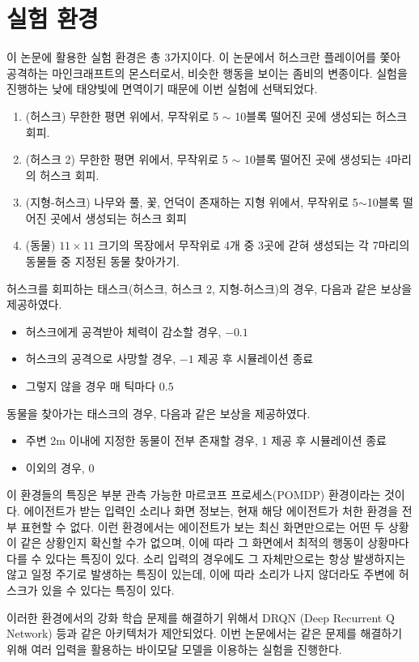 \documentclass[oneside, under, ko]{snuthesis}
\begin{document}
\section{실험 환경}
이 논문에 활용한 실험 환경은 총 3가지이다. 이 논문에서 허스크란 플레이어를 쫓아 공격하는 마인크래프트의 몬스터로서, 비슷한 행동을 보이는 좀비의 변종이다. 실험을 진행하는 낮에 태양빛에 면역이기 때문에 이번 실험에 선택되었다.
\begin{enumerate}
    \item (허스크) 무한한 평면 위에서, 무작위로 5 $\sim$ 10블록 떨어진 곳에 생성되는 허스크 회피.
    \item (허스크 2) 무한한 평면 위에서, 무작위로 5 $\sim$ 10블록 떨어진 곳에 생성되는 4마리의 허스크 회피.
    \item (지형-허스크) 나무와 풀, 꽃, 언덕이 존재하는 지형 위에서, 무작위로 5$\sim$10블록 떨어진 곳에서 생성되는 허스크 회피
    \item (동물) $11 \times 11$ 크기의 목장에서 무작위로 4개 중 3곳에 갇혀 생성되는 각 7마리의 동물들 중 지정된 동물 찾아가기.
\end{enumerate}
허스크를 회피하는 태스크(허스크, 허스크 2, 지형-허스크)의 경우, 다음과 같은 보상을 제공하였다.
\begin{itemize}
    \item 허스크에게 공격받아 체력이 감소할 경우, $-0.1$
    \item 허스크의 공격으로 사망할 경우, $-1$ 제공 후 시뮬레이션 종료
    \item 그렇지 않을 경우 매 틱마다 $0.5$
\end{itemize}
동물을 찾아가는 태스크의 경우, 다음과 같은 보상을 제공하였다.
\begin{itemize}
    \item 주변 2m 이내에 지정한 동물이 전부 존재할 경우, 1 제공 후 시뮬레이션 종료
    \item 이외의 경우, 0
\end{itemize}

이 환경들의 특징은 부분 관측 가능한 마르코프 프로세스(POMDP) 환경이라는 것이다. 에이전트가 받는 입력인 소리나 화면 정보는, 현재 해당 에이전트가 처한 환경을 전부 표현할 수 없다. 이런 환경에서는 에이전트가 보는 최신 화면만으로는 어떤 두 상황이 같은 상황인지 확신할 수가 없으며, 이에 따라 그 화면에서 최적의 행동이 상황마다 다를 수 있다는 특징이 있다. 소리 입력의 경우에도 그 자체만으로는 항상 발생하지는 않고 일정 주기로 발생하는 특징이 있는데, 이에 따라 소리가 나지 않더라도 주변에 허스크가 있을 수 있다는 특징이 있다.

이러한 환경에서의 강화 학습 문제를 해결하기 위해서 DRQN (Deep Recurrent Q Network) 등과 같은 아키텍처가 제안되었다. \cite{POMDP} 이번 논문에서는 같은 문제를 해결하기 위해 여러 입력을 활용하는 바이모달 모델을 이용하는 실험을 진행한다.
\end{document}
